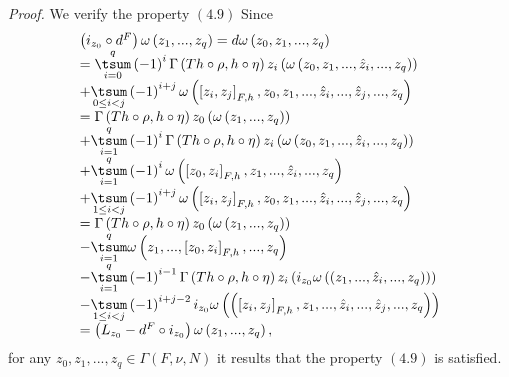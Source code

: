 \documentclass[11pt]{article}
\begin{document}
\emph{Proof. }We verify the property $\left( 4.9\right) $ Since
\begin{equation*}
\begin{array}{l}
\left( i_{z_{0}}\circ d^{F}\right) \omega \left( z_{1},...,z_{q}\right)
=d\omega \left( z_{0},z_{1},...,z_{q}\right) \\
=\overset{q}{\underset{i=0}{\tsum }}\left( -1\right) ^{i}\Gamma \left(
Th\circ \rho ,h\circ \eta \right) z_{i}\left( \omega \left( z_{0},z_{1},...,%
\hat{z}_{i},...,z_{q}\right) \right) \\
+\underset{0\leq i<j}{\tsum }\left( -1\right) ^{i+j}\omega \left( \left[
z_{i},z_{j}\right] _{F,h},z_{0},z_{1},...,\hat{z}_{i},...,\hat{z}%
_{j},...,z_{q}\right) \\
=\Gamma \left( Th\circ \rho ,h\circ \eta \right) z_{0}\left( \omega \left(
z_{1},...,z_{q}\right) \right) \\
+\overset{q}{\underset{i=1}{\tsum }}\left( -1\right) ^{i}\Gamma \left(
Th\circ \rho ,h\circ \eta \right) z_{i}\left( \omega \left( z_{0},z_{1},...,%
\hat{z}_{i},...,z_{q}\right) \right) \\
+\underset{i=1}{\overset{q}{\tsum }}\left( -1\right) ^{i}\omega \left( \left[
z_{0},z_{i}\right] _{F,h},z_{1},...,\hat{z}_{i},...,z_{q}\right) \\
+\underset{1\leq i<j}{\tsum }\left( -1\right) ^{i+j}\omega \left( \left[
z_{i},z_{j}\right] _{F,h},z_{0},z_{1},...,\hat{z}_{i},...,\hat{z}%
_{j},...,z_{q}\right) \\
=\Gamma \left( Th\circ \rho ,h\circ \eta \right) z_{0}\left( \omega \left(
z_{1},...,z_{q}\right) \right) \\
-\underset{i=1}{\overset{q}{\tsum }}\omega \left( z_{1},...,\left[
z_{0},z_{i}\right] _{F,h},...,z_{q}\right) \\
-\overset{q}{\underset{i=1}{\tsum }}\left( -1\right) ^{i-1}\Gamma \left(
Th\circ \rho ,h\circ \eta \right) z_{i}\left( i_{z_{0}}\omega \left( \left(
z_{1},...,\hat{z}_{i},...,z_{q}\right) \right) \right) \\
-\underset{1\leq i<j}{\tsum }\left( -1\right) ^{i+j-2}i_{z_{0}}\omega \left(
\left( \left[ z_{i},z_{j}\right] _{F,h},z_{1},...,\hat{z}_{i},...,\hat{z}%
_{j},...,z_{q}\right) \right) \\
=\left( L_{z_{0}}-d^{F}\circ i_{z_{0}}\right) \omega \left(
z_{1},...,z_{q}\right) ,%
\end{array}%
\end{equation*}%
for any $z_{0},z_{1},...,z_{q}\in \Gamma \left( F,\nu ,N\right) $ it results
that the property $\left( 4.9\right) $ is satisfied.
\end{document}
